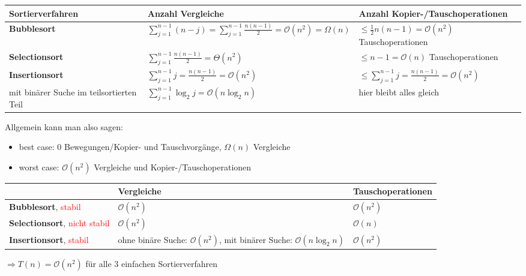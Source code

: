 \begin{tabular}{p{}|p{}|p{}}
	\cellcolor{lightgray}\textbf{Sortierverfahren} & \cellcolor{lightgray}\textbf{Anzahl Vergleiche} & \cellcolor{lightgray}\textbf{Anzahl Kopier-/Tauschoperationen} \\
	\hline
	\textbf{Bubblesort} & $\sum\limits_{j=1}^{n-1}(n-j) = \sum\limits_{j=1}^{n-1}\frac{n(n-1)}{2} = \mathcal{O}(n^2) = \Omega(n)$ & $\le\frac{1}{2}n(n-1)=\mathcal{O}(n^2)$ Tauschoperationen \\
	\hline
	\textbf{Selectionsort} & $\sum\limits_{j=1}^{n-1}\frac{n(n-1)}{2}=\Theta(n^2)$ & $\le n-1=\mathcal{O}(n)$ Tauschoperationen \\
	\hline
	\textbf{Insertionsort} & $\sum\limits_{j=1}^{n-1} j=\frac{n(n-1)}{2}=\mathcal{O}(n^2)$ & $\le\sum\limits_{j=1}^{n-1} j=\frac{n(n-1)}{2}=\mathcal{O}(n^2)$ \\
	mit binärer Suche im teilsortierten Teil & $\sum\limits_{j=1}^{n-1}\log_2 j=\mathcal{O}(n\log_2 n)$ & hier bleibt alles gleich \\
\end{tabular}

Allgemein kann man also sagen:
\begin{itemize}
	\item best case: 0 Bewegungen/Kopier- und Tauschvorgänge, $\Omega(n)$ Vergleiche
	\item worst case: $\mathcal{O}(n^2)$ Vergleiche und Kopier-/Tauschoperationen
\end{itemize}

\begin{tabularx}{\textwidth}{p{}|p{}|X}
	\cellcolor{lightgray} & \cellcolor{lightgray}\textbf{Vergleiche} & \cellcolor{lightgray}\textbf{Tauschoperationen} \\
	\hline
	\textbf{Bubblesort}, \textcolor{red}{stabil} & $\mathcal{O}(n^2)$ & $\mathcal{O}(n^2)$ \\
	\hline
	\textbf{Selectionsort}, \textcolor{red}{nicht stabil} & $\mathcal{O}(n^2)$ & $\mathcal{O}(n)$ \\
	\hline
	\textbf{Insertionsort}, \textcolor{red}{stabil} & ohne binäre Suche: $\mathcal{O}(n^2)$, mit binärer Suche: $\mathcal{O}(n\log_2 n)$ & $\mathcal{O}(n^2)$
\end{tabularx}
$\Rightarrow T(n)=\mathcal{O}(n^2)$ für alle 3 einfachen Sortierverfahren

